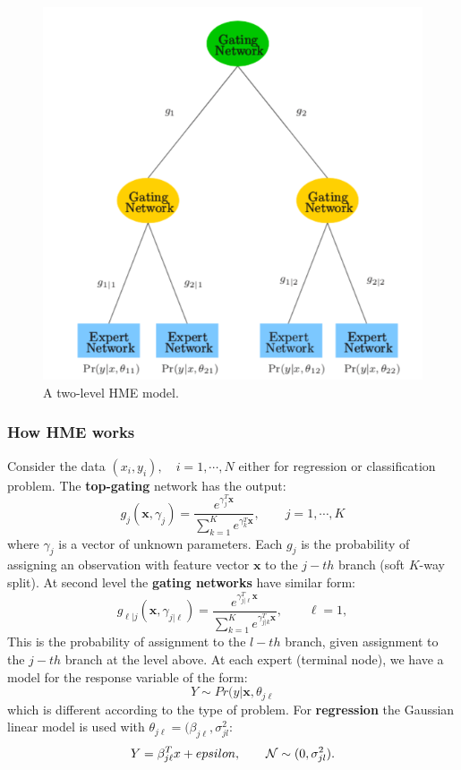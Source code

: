 \documentclass[12pt, letterpaper]{article}
\theoremstyle{definition}
\newcommand{\x}{\mathbf{x}}
\begin{document}
\begin{figure}
\centering
\includegraphics[scale=0.5]{img/HME}
\caption{A two-level HME model.}
\end{figure}
\subsubsection{How HME works}
Consider the data $(x_i, y_i), \quad i=1,\cdots, N$ either for regression or classification problem. The \textbf{top-gating} network has the output:
\begin{equation}
g_j(\x, \gamma_j) = \frac{e^{\gamma_j^T\x}}{\sum_{k=1}^Ke^{\gamma_k^T\x}}, \quad\quad j=1,\cdots, K
\end{equation}
where $\gamma_j$ is a vector of unknown parameters. Each $g_j$ is the probability of assigning an observation with feature vector $\x$ to the $j-th$ branch (soft $K$-way split). At second level the \textbf{gating networks} have similar form:
\begin{equation}
g_{\ell|j}(\x, \gamma_{j|\ell}) = \frac{e^{\gamma_{j|\ell}^T\x}}{\sum_{k=1}^Ke^{\gamma_{j|k}^T\x}}, \quad\quad \ell=1,
\end{equation}
This is the probability of assignment to the $l-th$ branch, given assignment to the $j-th$ branch at the level above. At each expert (terminal node), we have a model for the response variable of the form:
\begin{equation}
Y \sim Pr(y|\x, \theta_{j\ell}
\end{equation}
which is different according to the type of problem. For \textbf{regression} the Gaussian linear model is used with $\theta_{j\ell} = (\beta_{j\ell},\sigma^2_{jl}$:
\begin{equation}
Y = \beta_{j\ell}^Tx + epsilon, \quad\quad \CMcal{N} \sim(0,\sigma^2_{jl}). 
\end{equation}
\end{document}

